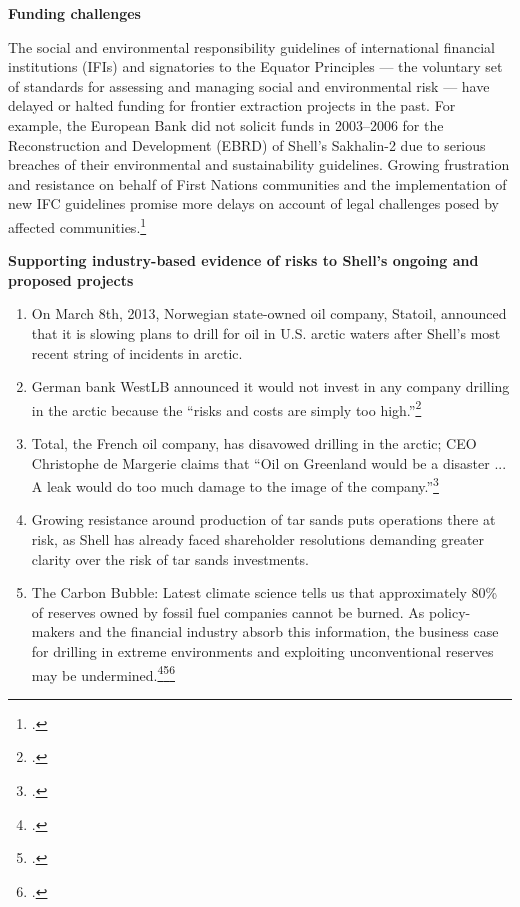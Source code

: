\textbf{Funding challenges}



The social and environmental responsibility guidelines of international financial institutions (IFIs) and signatories to the Equator Principles --- the voluntary set of standards for assessing and managing social and environmental risk --- have delayed or halted funding for frontier extraction projects in the past. 
For example, the European Bank did not solicit funds in 2003--2006 for the Reconstruction and Development (EBRD) of Shell's Sakhalin-2 due to serious breaches of their environmental and sustainability guidelines. 
Growing frustration and resistance on behalf of First Nations communities and the implementation of new IFC guidelines promise more delays on account of legal challenges posed by affected communities.\footcite[][]{Mathiason_2005}



\textbf{Supporting industry-based evidence of risks to Shell's ongoing and proposed projects}



\begin{enumerate}
	\item On March 8th, 2013, Norwegian state-owned oil company, Statoil, announced that it is slowing plans to drill for oil in U.S. arctic waters after Shell's most recent string of incidents in arctic.
	\item German bank WestLB announced it would not invest in any company drilling in the arctic because the ``risks and costs are simply too high.''\footcite[][]{Naidoo_2012}
	\item Total, the French oil company, has disavowed drilling in the arctic; CEO Christophe de Margerie claims that ``Oil on Greenland would be a disaster ... A leak would do too much damage to the image of the company.''\footcite[][]{NewsWire_2012}
	\item Growing resistance around production of tar sands puts operations there at risk, as Shell has already faced shareholder resolutions demanding greater clarity over the risk of tar sands investments.
	\item The Carbon Bubble: Latest climate science tells us that approximately 80\% of reserves owned by fossil fuel companies cannot be burned. As policy-makers and the financial industry absorb this information, the business case for drilling in extreme environments and exploiting unconventional reserves may be undermined.\footcite[][]{carbontracker}\footcite[][]{UNEP_2009}\footcite[][]{HSBC_2013}
\end{enumerate}


